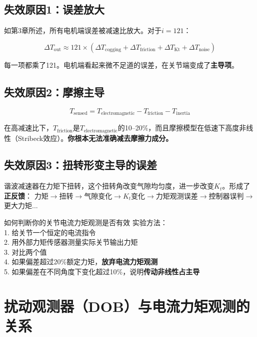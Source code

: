 \subsection{失效原因1：误差放大}

如第3章所述，所有电机端误差被减速比放大。对于$i=121$：

\begin{equation}
\Delta T_{\text{out}} \approx 121 \times (\Delta T_{\text{cogging}} + \Delta T_{\text{friction}} + \Delta T_{\text{Kt}} + \Delta T_{\text{noise}})
\end{equation}

每一项都乘了121。电机端看起来微不足道的误差，在关节端变成了\textbf{主导项}。

\subsection{失效原因2：摩擦主导}

\begin{equation}
T_{\text{sensed}} = T_{\text{electromagnetic}} - T_{\text{friction}} - T_{\text{inertia}}
\end{equation}

在高减速比下，$T_{\text{friction}}$是$T_{\text{electromagnetic}}$的10--20\%，而且摩擦模型在低速下高度非线性（Stribeck效应）。\textbf{你根本无法准确减去摩擦力成分。}

\subsection{失效原因3：扭转形变主导的误差}

谐波减速器在力矩下扭转，这个扭转角改变气隙均匀度，进一步改变$K_t$。形成了\textbf{正反馈}：
力矩$\rightarrow$扭转$\rightarrow$气隙变化$\rightarrow K_t$变化$\rightarrow$力矩观测误差$\rightarrow$控制器误判$\rightarrow$更大力矩...

\begin{debugbox}{如何判断你的关节电流力矩观测是否有效}
实验方法：\\
1. 给关节一个恒定的电流指令\\
2. 用外部力矩传感器测量实际关节输出力矩\\
3. 对比两个值\\
4. 如果偏差超过20\%额定力矩，\textbf{放弃电流力矩观测}\\
5. 如果偏差在不同角度下变化超过10\%，说明\textbf{传动非线性占主导}
\end{debugbox}

\section{扰动观测器（DOB）与电流力矩观测的关系}

